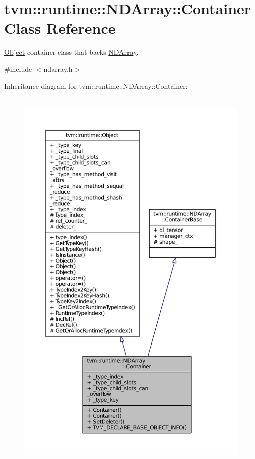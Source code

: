 \hypertarget{classtvm_1_1runtime_1_1NDArray_1_1Container}{}\section{tvm\+:\+:runtime\+:\+:N\+D\+Array\+:\+:Container Class Reference}
\label{classtvm_1_1runtime_1_1NDArray_1_1Container}


\hyperlink{classtvm_1_1runtime_1_1Object}{Object} container class that backs \hyperlink{classtvm_1_1runtime_1_1NDArray}{N\+D\+Array}.  




{\ttfamily \#include $<$ndarray.\+h$>$}



Inheritance diagram for tvm\+:\+:runtime\+:\+:N\+D\+Array\+:\+:Container\+:
\nopagebreak
\begin{figure}[H]
\begin{center}
\leavevmode
\includegraphics[height=550pt]{classtvm_1_1runtime_1_1NDArray_1_1Container__inherit__graph}
\end{center}
\end{figure}


